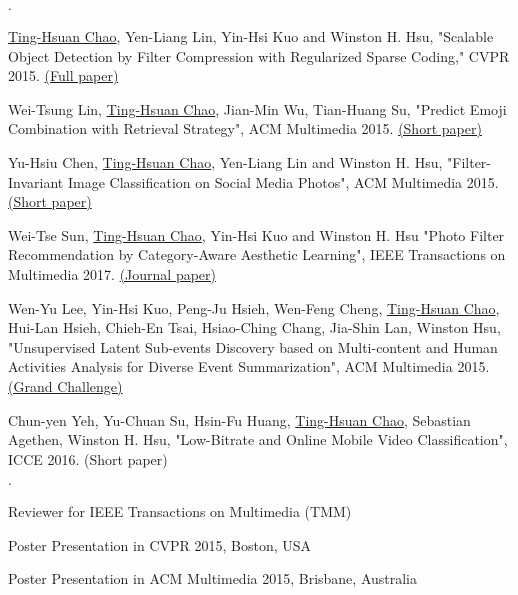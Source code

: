 \documentclass{joel_cv}
\begin{document}
\begin{sectionItemize}{$\cdot$}
    \item \underline{Ting-Hsuan Chao}, Yen-Liang Lin, Yin-Hsi Kuo and Winston H. Hsu, "Scalable Object Detection by Filter Compression with Regularized Sparse Coding," CVPR 2015. \href{http://www.cv-foundation.org/openaccess/content_cvpr_2015/html/Chao_Scalable_Object_Detection_2015_CVPR_paper.html}{(Full paper)}
    \item Wei-Tsung Lin, \underline{Ting-Hsuan Chao}, Jian-Min Wu, Tian-Huang Su, "Predict Emoji Combination with Retrieval Strategy", ACM Multimedia 2015. \href{https://www.anlp.jp/proceedings/annual_meeting/2019/pdf_dir/B2-5.pdf}{(Short paper)}
    \item Yu-Hsiu Chen, \underline{Ting-Hsuan Chao}, Yen-Liang Lin and Winston H. Hsu, "Filter-Invariant Image Classification on Social Media Photos", ACM Multimedia 2015. \href{http://dl.acm.org/citation.cfm?id=2806348}{(Short paper)}
    \item Wei-Tse Sun, \underline{Ting-Hsuan Chao}, Yin-Hsi Kuo and Winston H. Hsu "Photo Filter Recommendation by Category-Aware Aesthetic Learning", IEEE Transactions on Multimedia 2017. \href{http://joelthchao.github.io/pdf/photo_sun_tmm_2017.pdf}{(Journal paper)}
    \item Wen-Yu Lee, Yin-Hsi Kuo, Peng-Ju Hsieh, Wen-Feng Cheng, \underline{Ting-Hsuan Chao}, Hui-Lan Hsieh, Chieh-En Tsai, Hsiao-Ching Chang, Jia-Shin Lan, Winston Hsu, "Unsupervised Latent Sub-events Discovery based on Multi-content and Human Activities Analysis for Diverse Event Summarization", ACM Multimedia 2015. \href{http://dl.acm.org/citation.cfm?id=2809935}{(Grand Challenge)}
    \item Chun-yen Yeh, Yu-Chuan Su, Hsin-Fu Huang, \underline{Ting-Hsuan Chao}, Sebastian Agethen, Winston H. Hsu, "Low-Bitrate and Online Mobile Video Classification", ICCE 2016. (Short paper)
\end{sectionItemize}

%
%

\begin{sectionItemize}{$\cdot$}
    \item Reviewer for IEEE Transactions on Multimedia (TMM)
    \item Poster Presentation in CVPR 2015, Boston, USA
    \item Poster Presentation in ACM Multimedia 2015, Brisbane, Australia
\end{sectionItemize}
\end{document}
